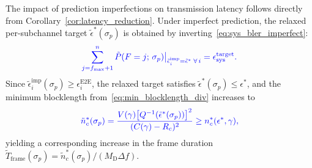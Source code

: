 \documentclass[lettersize,journal]{IEEEtran}
\providecommand{\DIFadd}[1]{{\protect\color{blue}#1}} %
\begin{document}
{\DIFadd{The impact of prediction imperfections on transmission latency
follows directly from
Corollary~\ref{cor:latency_reduction}.
Under imperfect prediction, the relaxed per-subchannel
target $\tilde{\epsilon}^{*}(\sigma_p)$ is obtained by
inverting~\eqref{eq:sys_bler_imperfect}:
}\begin{equation}
\DIFadd{\sum_{j=f_{\max}+1}^{n}
\tilde{P}(F=j;\,\sigma_p)\big|_{\tilde{\epsilon}_i^{\mathrm{imp}}
= \tilde{\epsilon}^{*}\;\forall\, i}
= \epsilon_{\mathrm{sys}}^{\mathrm{target}}.
\label{eq:eps_star_imperfect}
}\end{equation}
\DIFadd{Since
$\tilde{\epsilon}_i^{\mathrm{imp}}(\sigma_p) \geq
\epsilon_i^{\mathrm{E2E}}$, the relaxed target satisfies
$\tilde{\epsilon}^{*}(\sigma_p) \leq \epsilon^{*}$,
and the minimum blocklength
from~\eqref{eq:min_blocklength_div} increases to
}\begin{equation}
\DIFadd{\tilde{n}_c^{*}(\sigma_p)
= \frac{V(\gamma)\bigl[Q^{-1}
(\tilde{\epsilon}^{*}(\sigma_p))\bigr]^2}{(C(\gamma) - R_c)^2}
\geq n_c^{*}(\epsilon^{*}, \gamma),
\label{eq:min_blocklength_imperfect}
}\end{equation}
\DIFadd{yielding a corresponding increase in the frame duration
$\tilde{T}_{\mathrm{frame}}(\sigma_p) =
\tilde{n}_c^{*}(\sigma_p)/(M_{\mathrm{D}}\Delta f)$.
}}%
\end{document}
